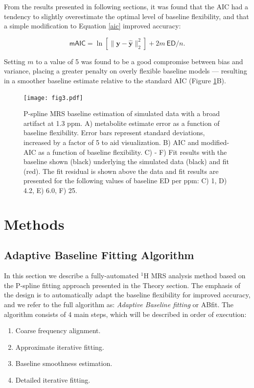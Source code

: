 \documentclass[num-refs]{wiley-article}
\begin{document}
From the results presented in following sections, it was found that the AIC had a tendency to slightly overestimate the optimal level of baseline flexibility, and that a simple modification to Equation \ref{aic} improved accuracy:

\begin{equation}
  \textsf{mAIC} = \ln \left[ \|\mathbf{y} - \hat{\mathbf{y}}\|^{2}_{2} \right] + 2 m \ \textsf{ED} / n.
  \label{maic}
\end{equation}

Setting $m$ to a value of 5 was found to be a good compromise between bias and variance, placing a greater penalty on overly flexible baseline models --- resulting in a smoother baseline estimate relative to the standard AIC (Figure \ref{mrs_bl_simple}B).

\begin{figure}
  \begin{center}
    \texttt{[image: fig3.pdf]}
    \caption{P-spline MRS baseline estimation of simulated data with a broad artifact at 1.3 ppm. A) metabolite estimate error as a function of baseline flexibility. Error bars represent standard deviations, increased by a factor of 5 to aid visualization. B) AIC and modified-AIC as a function of baseline flexibility. C) - F) Fit results with the baseline shown (black) underlying the simulated data (black) and fit (red). The fit residual is shown above the data and fit results are presented for the following values of baseline ED per ppm: C) 1, D) 4.2, E) 6.0, F) 25.}
    \label{mrs_bl_simple}
  \end{center}
\end{figure}

\section{Methods}
\subsection{Adaptive Baseline Fitting Algorithm}
In this section we describe a fully-automated $^1\mathrm{H}$ MRS analysis method based on the P-spline fitting approach presented in the Theory section. The emphasis of the design is to automatically adapt the baseline flexibility for improved accuracy, and we refer to the full algorithm as: \textit{Adaptive Baseline fitting} or ABfit. The algorithm consists of 4 main steps, which will be described in order of execution:

\begin{enumerate}
  \item Coarse frequency alignment.
  \item Approximate iterative fitting.
  \item Baseline smoothness estimation.
  \item Detailed iterative fitting.
\end{enumerate}
\end{document}
